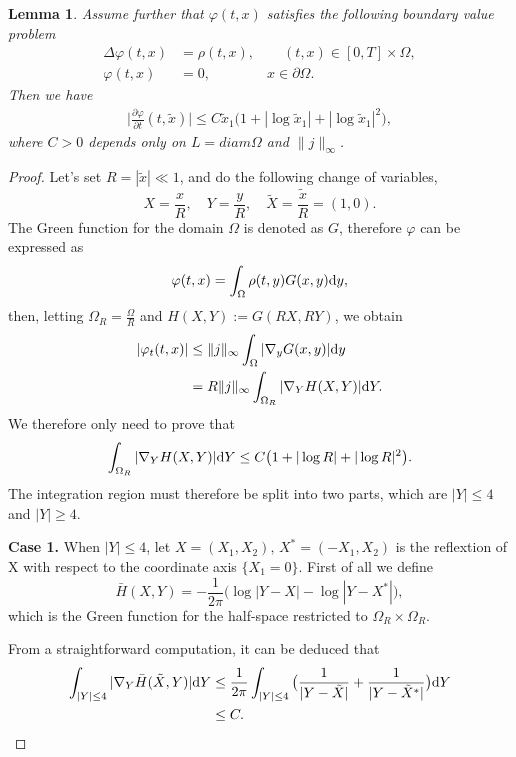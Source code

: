 \documentclass[11pt,reqno]{amsart}%
\newtheorem{Lemma}{Lemma}[section]
\theoremstyle{definition}
\theoremstyle{remark}
\begin{document}
\begin{Lemma}\label{L3}
Assume further that  $\varphi(t,x)$ satisfies the following boundary value problem
\begin{align}
\Delta \varphi(t,x)&=\rho(t,x), \qquad (t,x)\in[0,T]\times\Omega,\nonumber\\
\varphi(t,x)&=0,\qquad \qquad x\in\partial\Omega.\nonumber
\end{align}
Then we have
\begin{align}
\Big|\frac{\partial \varphi}{\partial t}(t,\tilde{x})\Big|\leq C\tilde{x}_{1}\big(1+|\log\tilde{x}_{1}|+|\log\tilde{x}_{1}|^{2}\big),\nonumber
\end{align}
where $C>0$ depends only on $L=diam \Omega$ and $\|j\|_{\infty}$.
\end{Lemma}
\begin{proof}
Let's set $R=|\tilde{x}|\ll 1$, and do the following change of variables,
$$X=\frac{x}{R},\quad Y=\frac{y}{R},\quad \tilde{X}=\frac{\tilde{x}}{R}=(1,0).$$
The Green function for the domain $\Omega$ is denoted as $G$, therefore $\varphi$  can be expressed as
$$\varphi(t,x)=\int_{\Omega}\rho(t,y)G(x,y){\rm d}y,$$
then, letting $\Omega_{R}=\frac{\Omega}{R}$ and $H(X,Y):=G(RX,RY)$,   we obtain
\begin{align}
|\varphi_{t}(t,x)|&\leq\|j\|_{\infty}\int_{\Omega}|\nabla_{y}G(x,y)|{\rm d}y \nonumber\\
&=R\|j\|_{\infty}\int_{\Omega_{R}}|\nabla_{Y}H(X,Y)|{\rm d}Y.\nonumber
\end{align}
We therefore only need to prove that
\begin{align}
\int_{\Omega_{R}}|\nabla_{Y}H(X,Y)|{\rm d}Y\leq C\big(1+|\log R|+|\log R|^{2}\big).\label{v7.4}
\end{align}
The integration region must therefore be split into two parts, which are $|Y|\leq 4$ and $|Y|\geq 4$.

{\bf Case 1.}  When $|Y|\leq 4$, let $X=(X_{1},X_{2}),\,X^{*}=(-X_{1},X_{2}) $ is the reflextion of X with respect to the coordinate axis $\{X_{1}=0\}$.
First of all we define
$$\bar{H}(X,Y)=-\frac{1}{2\pi}\big(\log|Y-X|-\log|Y-X^{*}|\big),$$
which is the Green function for the half-space restricted to $\Omega_{R}\times\Omega_{R}$.

From a straightforward computation, it can be deduced that
\begin{align}
\int_{|Y|\leq 4}|\nabla_{Y}\bar{H}(\tilde{X},Y)|{\rm d}Y&\leq \frac{1}{2\pi}\int_{|Y|\leq 4}\big(\frac{1}{|Y-\tilde{X}|}+\frac{1}{|Y-\tilde{X}^{*}|}\big){\rm d}Y\nonumber\\
&\leq C. \nonumber
\end{align}


\end{proof}
\end{document}
